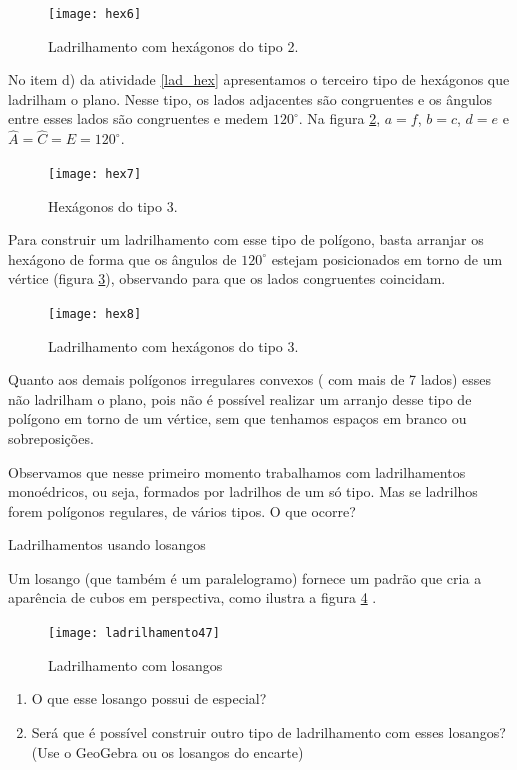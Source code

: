 \begin{figure}[H]
\centering
\texttt{[image: hex6]}
\label{hex6}
\caption{Ladrilhamento com hexágonos do tipo 2.}
\end{figure}

No item d) da atividade \ref{lad_hex} apresentamos o terceiro tipo de hexágonos que ladrilham o plano. Nesse tipo, os lados adjacentes são congruentes e os ângulos entre esses lados são congruentes e medem $120^{\circ}$. Na figura \ref{hex7}, $a=f$, $b=c$, $d=e$ e $\hat{A}=\hat{C}=\hat{E}= 120^{\circ}$.



\begin{figure}[H]
\centering
\texttt{[image: hex7]}
\label{hex7}
\caption{Hexágonos do tipo 3.}
\end{figure}

Para construir um ladrilhamento com esse tipo de polígono, basta arranjar os hexágono de forma que os ângulos de $120^{\circ}$ estejam posicionados em torno de um vértice (figura \ref{hex8}), observando para que os lados congruentes coincidam.

\begin{figure}[H]
\centering
\texttt{[image: hex8]}
\label{hex8}
\caption{Ladrilhamento com hexágonos do tipo 3.}
\end{figure}


Quanto aos demais polígonos irregulares convexos ( com mais de 7 lados) esses não ladrilham o plano, pois não é possível realizar um arranjo desse tipo de polígono em torno de um vértice, sem que tenhamos espaços em branco ou sobreposições.

Observamos que nesse primeiro momento trabalhamos com ladrilhamentos monoédricos, ou seja, formados por ladrilhos de um só tipo. Mas se  ladrilhos forem polígonos regulares, de vários tipos. O que ocorre?



\begin{task}{Ladrilhamentos usando losangos}

Um losango (que também é um paralelogramo) fornece um padrão que cria a aparência de cubos em perspectiva, como ilustra a figura \ref{losango} .

	\begin{figure}[H]
	\centering
	\texttt{[image: ladrilhamento47]}
	\label{losango}
    \caption{Ladrilhamento com losangos}
	\end{figure}
	
\begin{enumerate}
			\item O que esse losango possui de especial?
			\item Será que é possível construir outro tipo de ladrilhamento com esses losangos? (Use o GeoGebra ou os losangos do encarte)
\end{enumerate}
\end{task}

